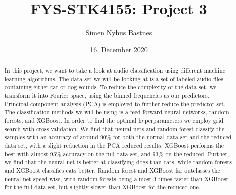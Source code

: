 \documentclass[a4paper]{article}
\title{FYS-STK4155: Project 3}
\author{Simen Nyhus Bastnes}
\date{16. December 2020}
\newcommand\red[1]{\textcolor{red}{\textbf{#1}}}
\begin{document}
\maketitle
\begin{abstract}
In this project, we want to take a look at audio classification using different machine learning algorithms. The data set we will be looking at is a set of labeled audio files containing either cat or dog sounds. To reduce the complexity of the data set, we transform it into Fourier space, using the binned frequencies as our predictors. Principal component analysis (PCA) is employed to further reduce the predictor set. The classification methods we will be using is a feed-forward neural networks, random forests, and XGBoost. In order to find the optimal hyperparameters we employ grid search with cross-validation.%
We find that neural nets and random forest classify the samples with an accuracy of around 90\% for both the normal data set and the reduced data set, with a slight reduction in the PCA reduced results. XGBoost performs the best with almost 95\% accuracy on the full data set, and 93\% on the reduced. Further, we find that the neural net is better at classifying dogs than cats, while random forests and XGBoost classifies cats better. Random forest and XGBoost far outclasses the neural net speed wise, with random forests being almost 3 times faster than XGBoost for the full data set, but slightly slower than XGBoost for the reduced one.


\end{abstract}
\end{document}
